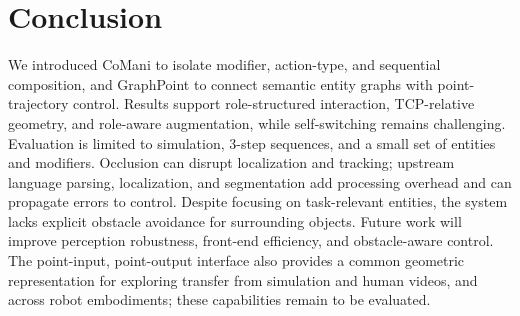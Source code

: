 \section{Conclusion}
We introduced CoMani to isolate modifier, action-type, and sequential composition, and GraphPoint to connect semantic entity graphs with point-trajectory control.
Results support role-structured interaction, TCP-relative geometry, and role-aware augmentation, while self-switching remains challenging.
Evaluation is limited to simulation, 3-step sequences, and a small set of entities and modifiers.
Occlusion can disrupt localization and tracking; upstream language parsing, localization, and segmentation add processing overhead and can propagate errors to control.
Despite focusing on task-relevant entities, the system lacks explicit obstacle avoidance for surrounding objects.
Future work will improve perception robustness, front-end efficiency, and obstacle-aware control.
The point-input, point-output interface also provides a common geometric representation for exploring transfer from simulation and human videos, and across robot embodiments; these capabilities remain to be evaluated.
